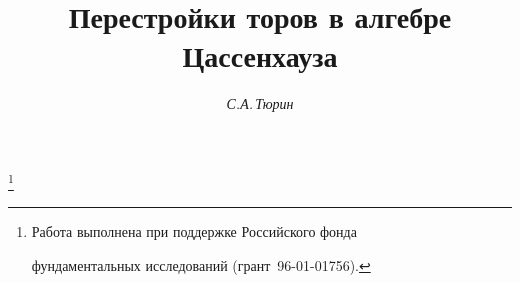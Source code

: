 

 




\newcommand{\la}{\langle} 


\newcommand{\ra}{\rangle} 


\newcommand{\Der}{\operatorname{Der}} 


\newcommand{\Ht}{\operatorname{ht}} 


\newcommand{\Ker}{\operatorname{Ker}} 


\newcommand{\cont}{\operatorname{cont}} 


\newcommand{\Mod}{\operatorname{mod}} 


\newcommand{\tts}[1]{} 


 




  


\setcounter{page}{54} 












 


\author{\it С.А.\,Тюрин} 




\title{Перестройки торов в алгебре Цассенхауза} 


\thanks{Работа выполнена при поддержке Российского фонда 


фундаментальных исследований (грант \No\,96-01-01756).} 


\date{} 




\pagestyle{plain} %


